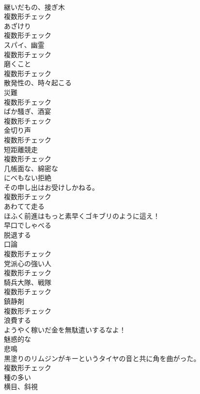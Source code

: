 \documentclass[8pt]{extreport}
\begin{document}
\begin{CJK}{UTF8}{min}
\\	[名詞]	継いだもの、接ぎ木	
\\	複数形チェック
\\	[名詞]	あざけり	
\\	複数形チェック
\\	[名詞]	スパイ、幽霊	
\\	複数形チェック
\\	[名詞]	磨くこと	
\\	複数形チェック
\\	[形容詞]	散発性の、時々起こる	
\\	[名詞]	災難	
\\	複数形チェック
\\	[名詞]	ばか騷ぎ、酒宴	
\\	複数形チェック
\\	[名詞]	金切り声	
\\	複数形チェック
\\	[名詞]	短距離競走	
\\	複数形チェック
\\	[形容詞]	几帳面な、綿密な	
\\	[名詞]	にべもない拒絶	
\\	その申し出はお受けしかねる。	
\\	複数形チェック
\\	[動詞]	あわてて走る	
\\	ほふく前進はもっと素早くゴキブリのように這え！	
\\	[動詞]	早口でしゃべる	
\\	[動詞]	脱退する	
\\	[名詞]	口論	
\\	複数形チェック
\\	[名詞]	党派心の強い人	
\\	複数形チェック
\\	[名詞]	騎兵大隊、戦隊	
\\	複数形チェック
\\	[名詞]	鎮静剤	
\\	複数形チェック
\\	[動詞]	浪費する	
\\	ようやく稼いだ金を無駄遣いするなよ！	
\\	[形容詞]	魅惑的な	
\\	[名詞]	悲鳴	
\\	黒塗りのリムジンがキーというタイヤの音と共に角を曲がった。	
\\	複数形チェック
\\	[形容詞]	種の多い	
\\	[名詞]	横目、斜視	

\end{CJK}
\end{document}
